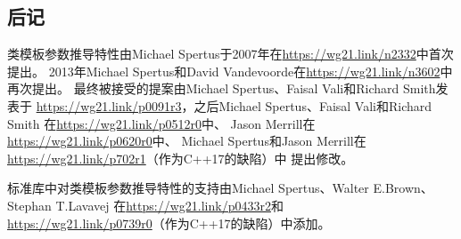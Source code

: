 \subsection{后记}
类模板参数推导特性由Michael Spertus于2007年在\url{https://wg21.link/n2332}中首次提出。
2013年Michael Spertus和David Vandevoorde在\url{https://wg21.link/n3602}中再次提出。
最终被接受的提案由Michael Spertus、Faisal Vali和Richard Smith发表于
\url{https://wg21.link/p0091r3}，之后Michael Spertus、Faisal Vali和Richard Smith
在\url{https://wg21.link/p0512r0}中、
Jason Merrill在\url{https://wg21.link/p0620r0}中、
Michael Spertus和Jason Merrill在\url{https://wg21.link/p702r1}（作为C++17的缺陷）中
提出修改。

标准库中对类模板参数推导特性的支持由Michael Spertus、Walter E.Brown、Stephan T.Lavavej
在\url{https://wg21.link/p0433r2}和\\
\url{https://wg21.link/p0739r0}（作为C++17的缺陷）中添加。

\setcounter{footnote}{0}